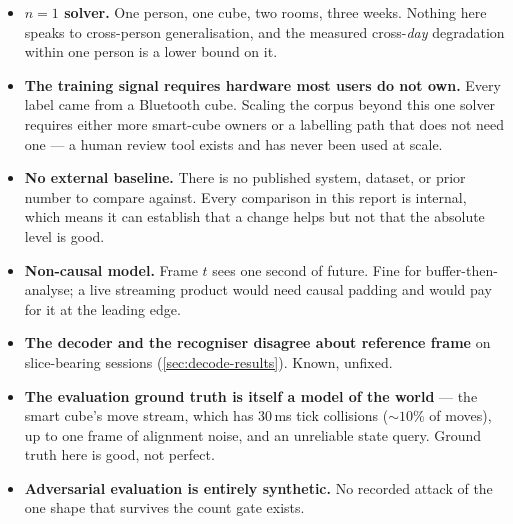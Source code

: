 \begin{itemize}[leftmargin=1.3em,itemsep=3pt]
\item \textbf{$n=1$ solver.} One person, one cube, two rooms, three weeks.
Nothing here speaks to cross-person generalisation, and the measured
cross-\emph{day} degradation within one person is a lower bound on it.
\item \textbf{The training signal requires hardware most users do not own.}
Every label came from a Bluetooth cube. Scaling the corpus beyond this one
solver requires either more smart-cube owners or a labelling path that does
not need one --- a human review tool exists and has never been used at scale.
\item \textbf{No external baseline.} There is no published system, dataset,
or prior number to compare against. Every comparison in this report is
internal, which means it can establish that a change helps but not that the
absolute level is good.
\item \textbf{Non-causal model.} Frame $t$ sees one second of future. Fine
for buffer-then-analyse; a live streaming product would need causal padding
and would pay for it at the leading edge.
\item \textbf{The decoder and the recogniser disagree about reference frame}
on slice-bearing sessions (\cref{sec:decode-results}). Known, unfixed.
\item \textbf{The evaluation ground truth is itself a model of the world}
--- the smart cube's move stream, which has 30\,ms tick collisions
(${\sim}10$\% of moves), up to one frame of alignment noise, and an
unreliable state query. Ground truth here is good, not perfect.
\item \textbf{Adversarial evaluation is entirely synthetic.} No recorded
attack of the one shape that survives the count gate exists.
\end{itemize}

